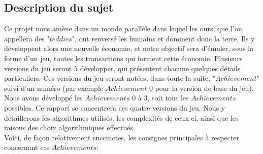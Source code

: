 \documentclass{article}
\begin{document}
    \subsection*{Description du sujet}
  Ce projet nous amène dans un monde parallèle dans lequel les ours, que l'on appellera des "$teddies$", ont renversé les humains et dominent donc la terre. Ils y développent alors une nouvelle économie, et notre objectif sera d'émuler, sous la forme d'un jeu, toutes les transactions qui forment cette économie. Plusieurs versions du jeu seront à développer, qui présentent chacune quelques détails particuliers. Ces versions du jeu seront notées, dans toute la suite, "$Achievement$" suivi d'un numéro (par exemple $Achievement$ 0 pour la version de base du jeu). \\
  Nous avons développé les $Achievements$ 0 à 3, soit tous les $Achievements$ possibles. Ce rapport se concentrera ces quatre versions du jeu. Nous y détaillerons les algorithmes utilisés, les complexités de ceux ci, ainsi que les raisons des choix algorithmiques effectués. \\ 
  Voici, de façon relativement succinctes, les consignes principales à respecter concernant ces  $Achievements$:
\end{document}
